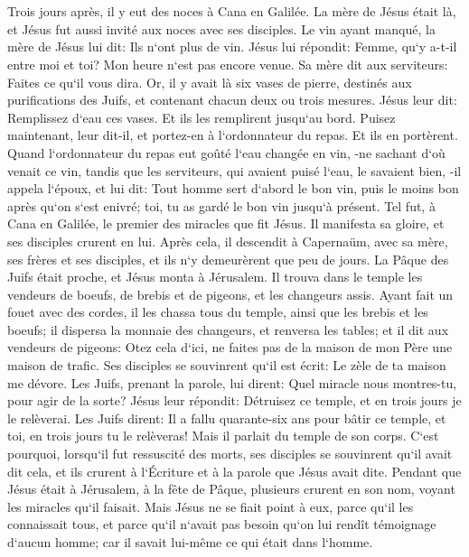 \chapter{}

\verse Trois jours après, il y eut des noces à Cana en Galilée. La mère de Jésus était là, 
\verse et Jésus fut aussi invité aux noces avec ses disciples. 
\verse Le vin ayant manqué, la mère de Jésus lui dit: Ils n`ont plus de vin. 
\verse Jésus lui répondit: Femme, qu`y a-t-il entre moi et toi? Mon heure n`est pas encore venue. 
\verse Sa mère dit aux serviteurs: Faites ce qu`il vous dira. 
\verse Or, il y avait là six vases de pierre, destinés aux purifications des Juifs, et contenant chacun deux ou trois mesures. 
\verse Jésus leur dit: Remplissez d`eau ces vases. Et ils les remplirent jusqu`au bord. 
\verse Puisez maintenant, leur dit-il, et portez-en à l`ordonnateur du repas. Et ils en portèrent. 
\verse Quand l`ordonnateur du repas eut goûté l`eau changée en vin, -ne sachant d`où venait ce vin, tandis que les serviteurs, qui avaient puisé l`eau, le savaient bien, -il appela l`époux, 
\verse et lui dit: Tout homme sert d`abord le bon vin, puis le moins bon après qu`on s`est enivré; toi, tu as gardé le bon vin jusqu`à présent. 
\verse Tel fut, à Cana en Galilée, le premier des miracles que fit Jésus. Il manifesta sa gloire, et ses disciples crurent en lui. 
\verse Après cela, il descendit à Capernaüm, avec sa mère, ses frères et ses disciples, et ils n`y demeurèrent que peu de jours. 
\verse La Pâque des Juifs était proche, et Jésus monta à Jérusalem. 
\verse Il trouva dans le temple les vendeurs de boeufs, de brebis et de pigeons, et les changeurs assis. 
\verse Ayant fait un fouet avec des cordes, il les chassa tous du temple, ainsi que les brebis et les boeufs; il dispersa la monnaie des changeurs, et renversa les tables; 
\verse et il dit aux vendeurs de pigeons: Otez cela d`ici, ne faites pas de la maison de mon Père une maison de trafic. 
\verse Ses disciples se souvinrent qu`il est écrit: Le zèle de ta maison me dévore. 
\verse Les Juifs, prenant la parole, lui dirent: Quel miracle nous montres-tu, pour agir de la sorte? 
\verse Jésus leur répondit: Détruisez ce temple, et en trois jours je le relèverai. 
\verse Les Juifs dirent: Il a fallu quarante-six ans pour bâtir ce temple, et toi, en trois jours tu le relèveras! 
\verse Mais il parlait du temple de son corps. 
\verse C`est pourquoi, lorsqu`il fut ressuscité des morts, ses disciples se souvinrent qu`il avait dit cela, et ils crurent à l`Écriture et à la parole que Jésus avait dite. 
\verse Pendant que Jésus était à Jérusalem, à la fête de Pâque, plusieurs crurent en son nom, voyant les miracles qu`il faisait. 
\verse Mais Jésus ne se fiait point à eux, parce qu`il les connaissait tous, 
\verse et parce qu`il n`avait pas besoin qu`on lui rendît témoignage d`aucun homme; car il savait lui-même ce qui était dans l`homme. 

